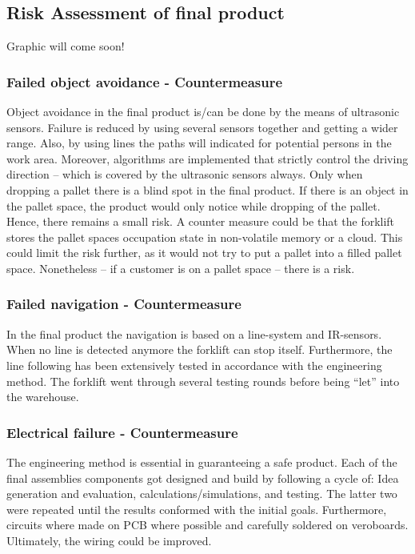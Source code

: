 \documentclass[../report.tex]{subfiles}
\begin{document}
\subsection{Risk Assessment of final product}
Graphic will come soon!
\subsubsection{Failed object avoidance - Countermeasure}
Object avoidance in the final product is/can be done by the means of ultrasonic sensors. 
Failure is reduced by using several sensors together and getting a wider range. Also, by 
using lines the paths will indicated for potential persons in the work area. Moreover, 
algorithms are implemented that strictly control the driving direction – 
which is covered by the ultrasonic sensors always. Only when dropping a pallet there is 
a blind spot in the final product. If there is an object in the pallet space, the product 
would only notice while dropping of the pallet. Hence, there remains a small risk. A counter 
measure could be that the forklift stores the pallet spaces occupation state in non-volatile 
memory or a cloud. This could limit the risk further, as it would not try to put a pallet into 
a filled pallet space. Nonetheless – if a customer is on a pallet space – there is a risk.

\subsubsection{Failed navigation - Countermeasure} 
In the final product the navigation is based on a line-system and IR-sensors. 
When no line is detected anymore the forklift can stop itself. Furthermore, 
the line following has been extensively tested in accordance with the engineering 
method. The forklift went through several testing rounds before being “let” into the warehouse.

\subsubsection{Electrical failure - Countermeasure} 
The engineering method is essential in guaranteeing a safe product. Each of the final assemblies 
components got designed and build by following a cycle of: Idea generation and evaluation, 
calculations/simulations, and testing. The latter two were repeated until the results conformed 
with the initial goals. 
Furthermore, circuits where made on PCB where possible and carefully soldered on veroboards. 
Ultimately, the wiring could be improved.
\end{document}
